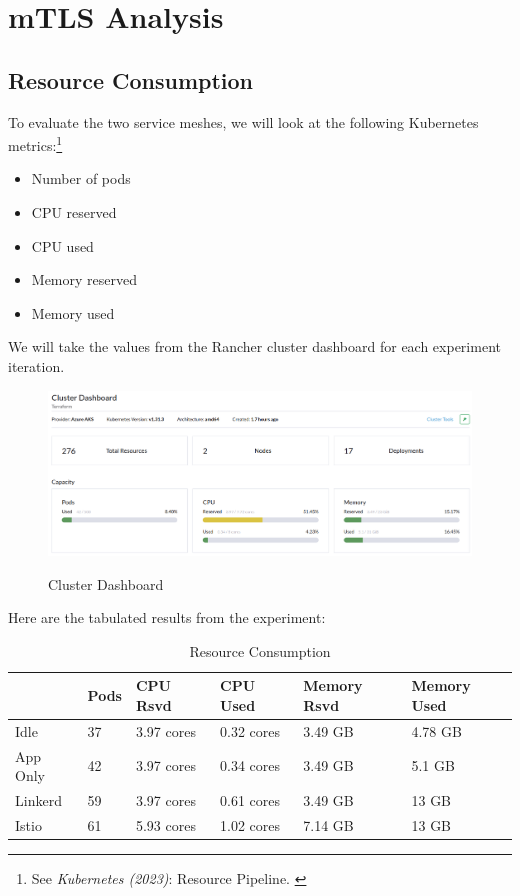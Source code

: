 %
%

\pagebreak
\section{mTLS Analysis}

\onehalfspacing

\subsection{Resource Consumption}

To evaluate the two service meshes, we will look at the following Kubernetes metrics:\footnote{See \textit{Kubernetes (2023)}: Resource Pipeline. \cite{resPipeline}}

\begin{itemize}
    \item Number of pods
    \item CPU reserved
    \item CPU used
    \item Memory reserved
    \item Memory used
\end{itemize}

We will take the values from the Rancher cluster dashboard for each experiment iteration.

\begin{figure}[H]
\centering
\caption {Cluster Dashboard}
\includegraphics[width=\linewidth]{images/cluster-dashboard.png}
\label{fig:clusterDashboard}
\end{figure}

Here are the tabulated results from the experiment:

\begin{table}[ht]
  \caption{Resource Consumption}
    \begin{tabular}{| l | l | l | l | l | l |}
    \hline
    & Pods & CPU Rsvd & CPU Used & Memory Rsvd & Memory Used \\
    \hline\hline
    Idle & 37 & 3.97 cores & 0.32 cores & 3.49 GB & 4.78 GB \\
    \hline
    App Only & 42 & 3.97 cores & 0.34 cores & 3.49 GB & 5.1 GB \\
    \hline
    Linkerd & 59 & 3.97 cores & 0.61 cores & 3.49 GB & 13 GB \\
    \hline
    Istio & 61 & 5.93 cores & 1.02 cores & 7.14 GB & 13 GB \\
    \hline
    \hline
    \end{tabular}
  \label{tab:resUsage}
\end{table}

